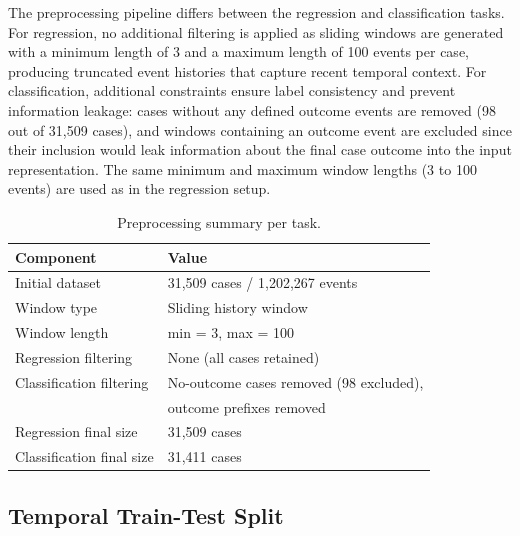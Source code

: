\documentclass[runningheads]{llncs}
\begin{document}
The preprocessing pipeline differs between the regression and classification tasks. For regression, no additional filtering is applied as sliding windows are generated with a minimum length of 3 and a maximum length of 100 events per case, producing truncated event histories that capture recent temporal context. For classification, additional constraints ensure label consistency and prevent information leakage: cases without any defined outcome events are removed (98 out of 31,509 cases), and windows containing an outcome event are excluded since their inclusion would leak information about the final case outcome into the input representation. The same minimum and maximum window lengths (3 to 100 events) are used as in the regression setup.

\begin{table}[H]
    \centering
    \caption{Preprocessing summary per task.}
    \label{tab:preprocessing-summary}
    \begin{tabularx}{\textwidth}{lX}
        \toprule
        Component & Value \\
        \midrule

        Initial dataset &
        31,509 cases / 1,202,267 events \\

        Window type &
        Sliding history window \\

        Window length &
        min = 3, max = 100 \\

        Regression filtering &
        None (all cases retained) \\

        Classification filtering &
        No-outcome cases removed (98 excluded), \\ & outcome prefixes removed \\

        Regression final size &
        31,509 cases \\

        Classification final size &
        31,411 cases \\

        \bottomrule
    \end{tabularx}
\end{table}

\subsection{Temporal Train-Test Split}
\label{sec:split}
\end{document}
